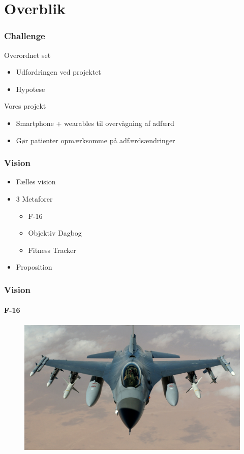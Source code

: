 \section{Overblik}
\begin{frame}
\frametitle{Challenge}
Overordnet set
\begin{itemize}
	\item Udfordringen ved projektet
	\item Hypotese
\end{itemize}
Vores projekt
\begin{itemize}
	\item Smartphone + wearables til overvågning af adfærd
	\item Gør patienter opmærksomme på adfærdsændringer
\end{itemize}
\end{frame}

\begin{frame}
\frametitle{Vision}
\begin{itemize}
	\item Fælles vision
	\item 3 Metaforer
	\begin{itemize}
		\item F-16
		\item Objektiv Dagbog
		\item Fitness Tracker
	\end{itemize}
	\item Proposition
\end{itemize}
\end{frame}

\begin{frame}
\frametitle{Vision}
\framesubtitle{F-16}
\begin{figure}
	\includegraphics[scale=0.4]{graphics/F16}
\end{figure}
\end{frame}

